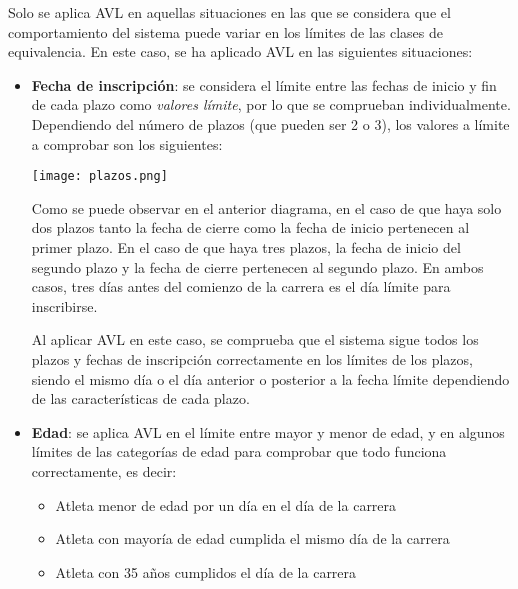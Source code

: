 Solo se aplica AVL en aquellas situaciones en las que se considera que el comportamiento del
sistema puede variar en los límites de las clases de equivalencia. En este caso, se ha aplicado
AVL en las siguientes situaciones:

\begin{itemize}
	\item \textbf{Fecha de inscripción}: se considera el límite entre las fechas de inicio y
		fin de cada plazo como \textit{valores límite}, por lo que se comprueban individualmente.
		Dependiendo del número de plazos (que pueden ser 2 o 3), los valores a límite a comprobar
		son los siguientes: \\\begin{minipage}{\linewidth}
			\centering
			\texttt{[image: plazos.png]}
		\end{minipage}

		Como se puede observar en el anterior diagrama, en el caso de que haya solo dos plazos
		tanto la fecha de cierre como la fecha de inicio pertenecen al primer plazo. En el caso
		de que haya tres plazos, la fecha de inicio del segundo plazo y la fecha de cierre
		pertenecen al segundo plazo. En ambos casos, tres días antes del comienzo de la carrera
		es el día límite para inscribirse.

		Al aplicar AVL en este caso, se comprueba que el sistema sigue todos los plazos y fechas
		de inscripción correctamente en los límites de los plazos, siendo el mismo día o el día
		anterior o posterior a la fecha límite dependiendo de las características de cada plazo.
	\item \textbf{Edad}: se aplica AVL en el límite entre mayor y menor de edad, y en algunos
		límites de las categorías de edad para comprobar que todo funciona correctamente, es
		decir: \begin{itemize}
			\item Atleta menor de edad por un día en el día de la carrera
			\item Atleta con mayoría de edad cumplida el mismo día de la carrera
			\item Atleta con 35 años cumplidos el día de la carrera
		\end{itemize}
\end{itemize}
